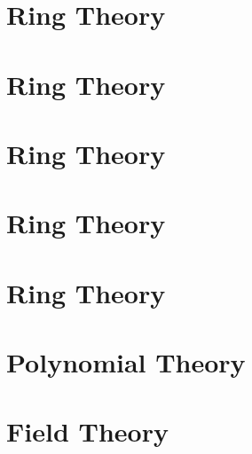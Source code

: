 \documentclass[11pt,lang=en]{elegantbook}
\begin{document}
\chapter{Ring Theory}

\chapter{Ring Theory}

\chapter{Ring Theory}

\chapter{Ring Theory}

\chapter{Ring Theory}

\chapter{Polynomial Theory}

\chapter{Field Theory}









\end{document}

